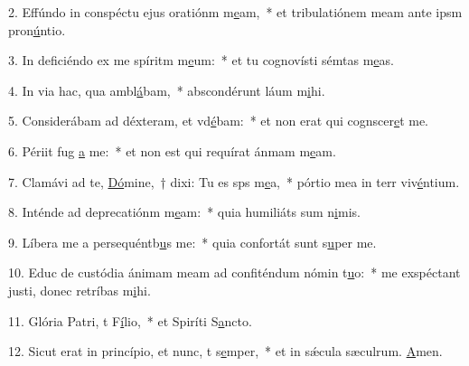 2. Effúndo in conspéctu ejus oratiónm m\uline{e}am,~* et tribulatiónem meam ante ipsm pron\uline{ú}ntio.\par 
3. In deficiéndo ex me spíritm m\uline{e}um:~* et tu cognovísti sémtas m\uline{e}as.\par 
4. In via hac, qua ambl\uline{á}bam,~* abscondérunt láum m\uline{i}hi.\par 
5. Considerábam ad déxteram, et vd\uline{é}bam:~* et non erat qui cognscer\uline{e}t me.\par 
6. Périit fug \uline{a} me:~* et non est qui requírat ánmam m\uline{e}am.\par 
7. Clamávi ad te, \uline{Dó}mine,~† dixi: Tu es sps m\uline{e}a,~* pórtio mea in terr viv\uline{é}ntium.\par 
8. Inténde ad deprecatiónm m\uline{e}am:~* quia humiliáts sum n\uline{i}mis.\par 
9. Líbera me a persequéntb\uline{u}s me:~* quia confortát sunt s\uline{u}per me.\par 
10. Educ de custódia ánimam meam ad confiténdum nómin t\uline{u}o:~* me exspéctant justi, donec retríbas m\uline{i}hi.\par 
11. Glória Patri, t F\uline{í}lio,~* et Spiríti S\uline{a}ncto.\par 
12. Sicut erat in princípio, et nunc, t s\uline{e}mper,~* et in sǽcula sæculrum. \uline{A}men.\par 
